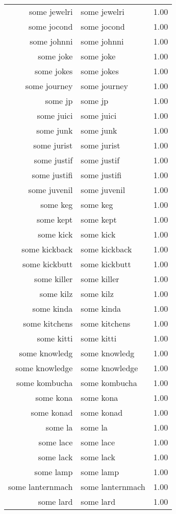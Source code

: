 \begin{table}[ht]
\begin{tabular}{rlr}
  some jewelri & some jewelri & 1.00 \\ 
  some jocond & some jocond & 1.00 \\ 
  some johnni & some johnni & 1.00 \\ 
  some joke & some joke & 1.00 \\ 
  some jokes & some jokes & 1.00 \\ 
  some journey & some journey & 1.00 \\ 
  some jp & some jp & 1.00 \\ 
  some juici & some juici & 1.00 \\ 
  some junk & some junk & 1.00 \\ 
  some jurist & some jurist & 1.00 \\ 
  some justif & some justif & 1.00 \\ 
  some justifi & some justifi & 1.00 \\ 
  some juvenil & some juvenil & 1.00 \\ 
  some keg & some keg & 1.00 \\ 
  some kept & some kept & 1.00 \\ 
  some kick & some kick & 1.00 \\ 
  some kickback & some kickback & 1.00 \\ 
  some kickbutt & some kickbutt & 1.00 \\ 
  some killer & some killer & 1.00 \\ 
  some kilz & some kilz & 1.00 \\ 
  some kinda & some kinda & 1.00 \\ 
  some kitchens & some kitchens & 1.00 \\ 
  some kitti & some kitti & 1.00 \\ 
  some knowledg & some knowledg & 1.00 \\ 
  some knowledge & some knowledge & 1.00 \\ 
  some kombucha & some kombucha & 1.00 \\ 
  some kona & some kona & 1.00 \\ 
  some konad & some konad & 1.00 \\ 
  some la & some la & 1.00 \\ 
  some lace & some lace & 1.00 \\ 
  some lack & some lack & 1.00 \\ 
  some lamp & some lamp & 1.00 \\ 
  some lanternmach & some lanternmach & 1.00 \\ 
  some lard & some lard & 1.00 \\ 

\end{tabular}
\end{table}
